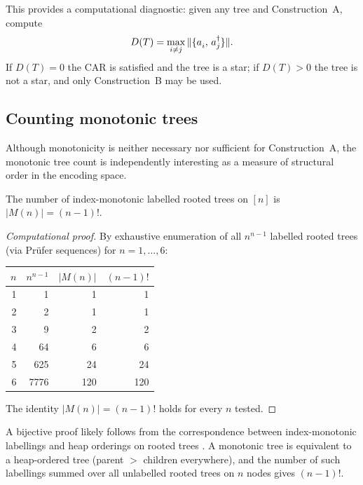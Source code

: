 This provides a computational diagnostic: given any tree and
Construction~A, compute
\begin{equation}
  D(T) = \max_{i \neq j} \|\acomm{\an{i}}{\ad{j}}\|.
\end{equation}
If $D(T) = 0$ the CAR is satisfied and the tree is a star; if
$D(T) > 0$ the tree is not a star, and only
Construction~B may be used.

\subsection{Counting monotonic trees}
\label{sec:pb-counting}

Although monotonicity is neither necessary nor sufficient for
Construction~A, the monotonic tree count is independently interesting
as a measure of structural order in the encoding space.

\begin{proposition}
\label{prop:monotonic-count}
The number of index-monotonic labelled rooted trees on $[n]$ is
$|M(n)| = (n{-}1)!$.
\end{proposition}

\begin{proof}[Computational proof]
By exhaustive enumeration of all $n^{n-1}$ labelled rooted trees
(via Pr\"ufer sequences) for $n = 1, \ldots, 6$:

\begin{center}
\begin{tabular}{@{}rrrr@{}}
\toprule
$n$ & $n^{n-1}$ & $|M(n)|$ & $(n{-}1)!$ \\
\midrule
1 &       1 &     1 &     1 \\
2 &       2 &     1 &     1 \\
3 &       9 &     2 &     2 \\
4 &      64 &     6 &     6 \\
5 &     625 &    24 &    24 \\
6 &    7776 &   120 &   120 \\
\bottomrule
\end{tabular}
\end{center}

The identity $|M(n)| = (n{-}1)!$ holds for every $n$ tested.
\end{proof}

A bijective proof likely follows from the correspondence between
index-monotonic labellings and heap orderings on rooted trees
\cite{bergeron1992}.  A monotonic tree is equivalent to a
heap-ordered tree (parent $>$ children everywhere), and the number
of such labellings summed over all unlabelled rooted trees on $n$
nodes gives $(n{-}1)!$.


